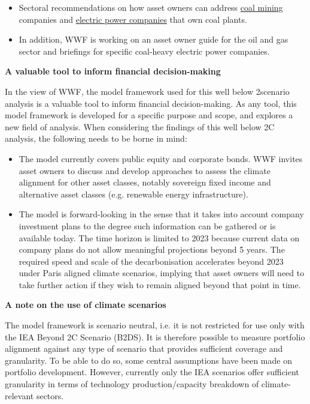 \documentclass[10pt,table,a4]{article}\usepackage[]{graphicx}\usepackage[]{color}
\begin{document}
\begin{multicols}{2}
\begin{itemize}
			\item Sectoral recommendations on how asset owners can address \hyperlink{http://d2ouvy59p0dg6k.cloudfront.net/downloads/3717\_WWF\_Asset\_Owner\_Guide\_on\_Coal\_Mining\_06\_mr.pdf}{coal mining} companies and \hyperlink{http://d2ouvy59p0dg6k.cloudfront.net/downloads/3717\_WWF\_Asset\_Owner\_Guide\_on\_Coal\_and\_Renewable\_electric\_power\_utilities\_06\_mr.pdf}{electric power companies} that own coal plants.
			
			\item In addition, WWF is working on an asset owner guide for the oil and gas sector and briefings for specific coal-heavy electric power companies.
		
	\end{itemize}
	
		\textbf{A valuable tool to inform financial decision-making}
		
		In the view of WWF, the model framework used for this well below 2\degree scenario analysis is a valuable tool to inform financial decision-making. As any tool, this model framework is developed for a specific purpose and scope, and explores a new field of analysis. When considering the findings of this well below 2\degree C analysis, the following needs to be borne in mind:
		
		\begin{itemize}
			\item The model currently covers public equity and corporate bonds. WWF invites asset owners to discuss and develop approaches to assess the climate alignment for other asset classes, notably sovereign fixed income and alternative asset classes (e.g. renewable energy infrastructure).
			
			\item The model is forward-looking in the sense that it takes into account company investment plans to the degree such information can be gathered or is available today. The time horizon is limited to 2023 because current data on company plans do not allow meaningful projections beyond 5 years. The required speed and scale of the decarbonisation accelerates beyond 2023 under Paris aligned climate scenarios, implying that asset owners will need to take further action if they wish to remain aligned beyond that point in time.
		\end{itemize}
	
		\textbf{A note on the use of climate scenarios}
		
		The model framework is scenario neutral, i.e. it is not restricted for use only with the IEA Beyond 2\degree C Scenario (B2DS). It is therefore possible to measure portfolio alignment against any type of scenario that provides sufficient coverage and granularity. To be able to do so, some central assumptions have been made on portfolio development. However, currently only the IEA scenarios offer sufficient granularity in terms of technology production/capacity breakdown of climate-relevant sectors.  
		

\end{multicols}
\end{document}
